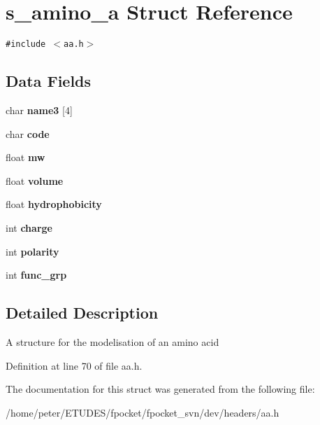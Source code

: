 \hypertarget{structs__amino__a}{
\section{s\_\-amino\_\-a Struct Reference}
\label{structs__amino__a}
}
{\tt \#include $<$aa.h$>$}

\subsection*{Data Fields}
\begin{CompactItemize}
\item 
\hypertarget{structs__amino__a_ea8b997108e6468326b00183bd6eb0c7}{
char \textbf{name3} \mbox{[}4\mbox{]}}
\label{structs__amino__a_ea8b997108e6468326b00183bd6eb0c7}

\item 
\hypertarget{structs__amino__a_f55283d22dfd4128a6475c517819ee06}{
char \textbf{code}}
\label{structs__amino__a_f55283d22dfd4128a6475c517819ee06}

\item 
\hypertarget{structs__amino__a_0c82f3a8524b934028b8289a41c8ee91}{
float \textbf{mw}}
\label{structs__amino__a_0c82f3a8524b934028b8289a41c8ee91}

\item 
\hypertarget{structs__amino__a_4ddae5fde18856a3dab901009673d4f6}{
float \textbf{volume}}
\label{structs__amino__a_4ddae5fde18856a3dab901009673d4f6}

\item 
\hypertarget{structs__amino__a_8c7db917f840ebd0dad9a378a4be4b92}{
float \textbf{hydrophobicity}}
\label{structs__amino__a_8c7db917f840ebd0dad9a378a4be4b92}

\item 
\hypertarget{structs__amino__a_0f912bcd04ae9f99a8f3a45e736d9d16}{
int \textbf{charge}}
\label{structs__amino__a_0f912bcd04ae9f99a8f3a45e736d9d16}

\item 
\hypertarget{structs__amino__a_e6101783dcf52f5de7ed94729c55096b}{
int \textbf{polarity}}
\label{structs__amino__a_e6101783dcf52f5de7ed94729c55096b}

\item 
\hypertarget{structs__amino__a_1e4bec2abdf9140e3490fac980a5702c}{
int \textbf{func\_\-grp}}
\label{structs__amino__a_1e4bec2abdf9140e3490fac980a5702c}

\end{CompactItemize}


\subsection{Detailed Description}
A structure for the modelisation of an amino acid 

Definition at line 70 of file aa.h.

The documentation for this struct was generated from the following file:\begin{CompactItemize}
\item 
/home/peter/ETUDES/fpocket/fpocket\_\-svn/dev/headers/aa.h\end{CompactItemize}
